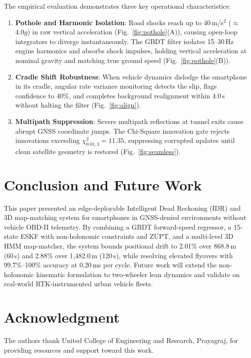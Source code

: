 \documentclass[conference]{IEEEtran}
\begin{document}
The empirical evaluation demonstrates three key operational characteristics:
\begin{enumerate}
\item \textbf{Pothole and Harmonic Isolation}: Road shocks reach up to 40\,m/s$^2$ ($\approx$4.0$g$) in raw vertical acceleration (Fig.~\ref{fig:pothole}(A)), causing open-loop integrators to diverge instantaneously. The GBDT filter isolates 15--30\,Hz engine harmonics and absorbs shock impulses, holding vertical acceleration at nominal gravity and matching true ground speed (Fig.~\ref{fig:pothole}(B)).
\item \textbf{Cradle Shift Robustness}: When vehicle dynamics dislodge the smartphone in its cradle, angular rate variance monitoring detects the slip, flags confidence to 40\%, and completes background realignment within 4.0\,s without halting the filter (Fig.~\ref{fig:align}).
\item \textbf{Multipath Suppression}: Severe multipath reflections at tunnel exits cause abrupt GNSS coordinate jumps. The Chi-Square innovation gate rejects innovations exceeding $\chi^2_{0.01, 3} = 11.35$, suppressing corrupted updates until clean satellite geometry is restored (Fig.~\ref{fig:seamless}).
\end{enumerate}

\section{Conclusion and Future Work}

This paper presented an edge-deployable Intelligent Dead Reckoning (IDR) and 3D map-matching system for smartphones in GNSS-denied environments without vehicle OBD-II telemetry. By combining a GBDT forward-speed regressor, a 15-state ESKF with non-holonomic constraints and ZUPT, and a multi-level 3D HMM map-matcher, the system bounds positional drift to 2.01\% over 868.8\,m (60\,s) and 2.88\% over 1{,}482.0\,m (120\,s), while resolving elevated flyovers with 99.7\%--100\% accuracy at 0.20\,ms per cycle. Future work will extend the non-holonomic kinematic formulation to two-wheeler lean dynamics and validate on real-world RTK-instrumented urban vehicle fleets.

\section*{Acknowledgment}
The authors thank United College of Engineering and Research, Prayagraj, for providing resources and support toward this work.
\end{document}
